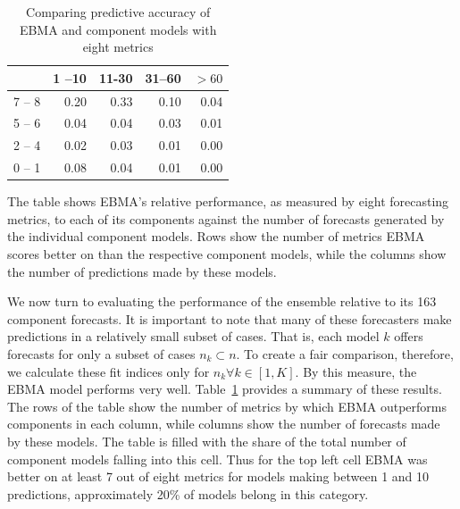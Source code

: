 \documentclass[12pt,fullpage,endnotes]{article}
\begin{document}
\begin{table}[ht]
\begin{center}
\caption{Comparing predictive accuracy of EBMA and component models with eight metrics}
\begin{tabular}{rrrrr}
  \toprule
 & 1 --10& 11-30 & 31--60 & $>60$ \\ 
  \midrule
7 -- 8 & 0.20 & 0.33 & 0.10 & 0.04 \\ 
 5 -- 6  & 0.04 & 0.04 & 0.03 & 0.01 \\ 
 2 -- 4 & 0.02 & 0.03 & 0.01 & 0.00 \\ 
 0 -- 1 & 0.08 & 0.04 & 0.01 & 0.00 \\ 
   \bottomrule
\end{tabular}
\end{center}
\label{compareTable2}
The table shows EBMA's relative performance, as measured by eight forecasting metrics, to each of its components against the number of forecasts generated by the individual component models.  
Rows show the number of metrics EBMA scores better on than the respective component models, while the columns show the number of predictions made by these models. 
\end{table}



We now turn to evaluating the performance of the ensemble relative to
its 163 component forecasts.  It is important to note that many of
these forecasters make predictions in a relatively small subset of
cases.  That is, each model $k$ offers forecasts for only a subset of
cases $n_k \subset n$.  To create a fair comparison, therefore, we
calculate these fit indices only for $n_k \forall k \in [1,K]$.  By
this measure, the EBMA model performs very well.
Table~\ref{compareTable2} provides a summary of these results.
The rows of the table show the number of metrics by which EBMA outperforms components in each column, while columns show the number of forecasts made by these models. The table is filled with the share of the total number of component models falling into this cell. Thus for the top left cell EBMA was better on at least 7 out of eight metrics for models making between 1 and 10 predictions, approximately 20\% of models belong in this category. 
\end{document}
